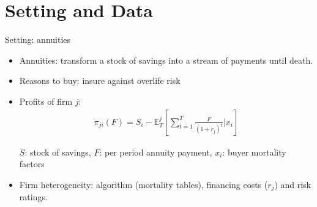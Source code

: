 \documentclass[10pt,aspectratio=169]{beamer}
\begin{document}

\section{Setting and Data}

\begin{frame}{Setting: annuities}\label{slide:setting}
    
    \begin{itemize}%
    \item Annuities: transform a stock of savings into a stream of payments until death.
    \item Reasons to buy: insure against overlife risk
        \item Profits of firm $j$: 
    \begin{align*}
    \pi_{ji}(F) = S_i-  \mathbb{E}^j_{T} \left[\sum_{t=1}^T\frac{F}{(1+r_j)^t}|x_i \right]
    \end{align*}
   
     $S$: stock of savings, $F$: per period annuity payment, $x_i$: buyer mortality factors
    
    \item Firm heterogeneity: algorithm (mortality tables), financing costs ($r_j$) and risk ratings. 
    
    \end{itemize}


\end{frame}

\end{document}
